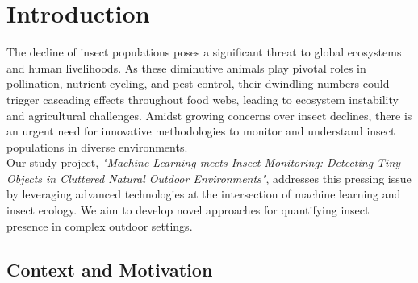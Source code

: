 \documentclass[sigchi,screen]{acmart}
\begin{document}



\maketitle


\section{Introduction}\label{ch01:intro}

The decline of insect populations poses a significant threat to global ecosystems and human livelihoods. As these diminutive animals play pivotal roles in pollination, nutrient cycling, and pest control, their dwindling numbers could trigger cascading effects throughout food webs, leading to ecosystem instability and agricultural challenges. Amidst growing concerns over insect declines, there is an urgent need for innovative methodologies to monitor and understand insect populations in diverse environments.\\
Our study project, \textit{"Machine Learning meets Insect Monitoring: Detecting Tiny Objects in Cluttered Natural Outdoor Environments"}, addresses this pressing issue by leveraging advanced technologies at the intersection of machine learning and insect ecology. We aim to develop novel approaches for quantifying insect presence in complex outdoor settings.

\subsection{Context and Motivation}
\end{document}
